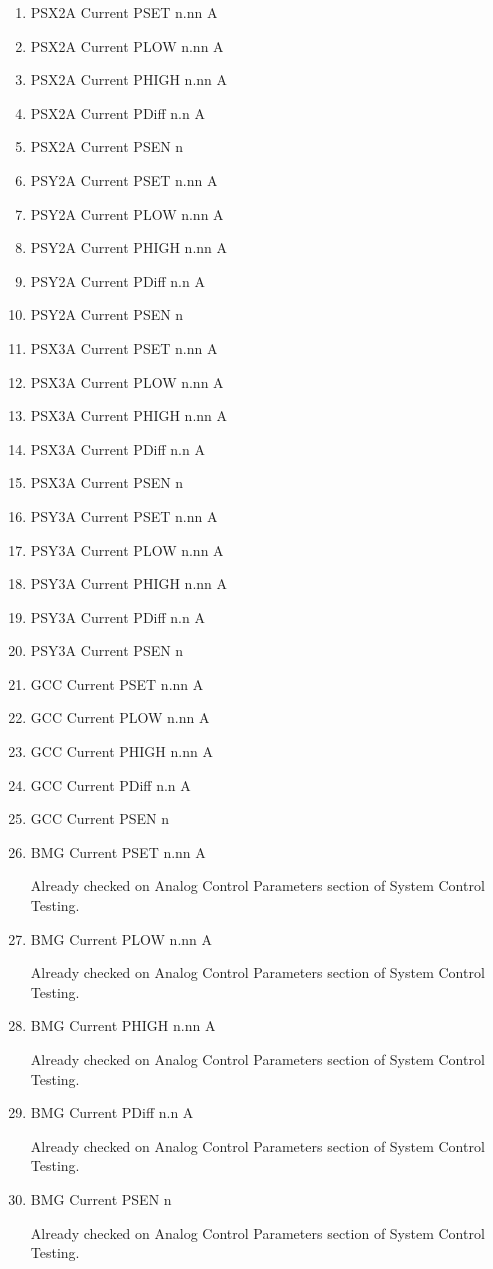 \documentclass[11pt]{book}		%
\begin{document}
\begin{enumerate}
 \item PSX2A Current PSET  n.nn A
 \item PSX2A Current PLOW  n.nn A
 \item PSX2A Current PHIGH n.nn A
 \item PSX2A Current PDiff n.n A
 \item PSX2A Current PSEN  n
 \item PSY2A Current PSET  n.nn A
 \item PSY2A Current PLOW  n.nn A
 \item PSY2A Current PHIGH n.nn A
 \item PSY2A Current PDiff n.n A
 \item PSY2A Current PSEN  n
 \item PSX3A Current PSET  n.nn A
 \item PSX3A Current PLOW  n.nn A
 \item PSX3A Current PHIGH n.nn A
 \item PSX3A Current PDiff n.n A
 \item PSX3A Current PSEN  n
 \item PSY3A Current PSET  n.nn A
 \item PSY3A Current PLOW  n.nn A
 \item PSY3A Current PHIGH n.nn A
 \item PSY3A Current PDiff n.n A
 \item PSY3A Current PSEN  n
 \item GCC Current PSET  n.nn A
 \item GCC Current PLOW  n.nn A
 \item GCC Current PHIGH n.nn A
 \item GCC Current PDiff n.n A
 \item GCC Current PSEN  n
 \item BMG Current PSET  n.nn A

\color{red}
Already checked on Analog Control Parameters section of System Control Testing.
\color{black}

 \item BMG Current PLOW  n.nn A

\color{red}
Already checked on Analog Control Parameters section of System Control Testing.
\color{black}

 \item BMG Current PHIGH n.nn A

\color{red}
Already checked on Analog Control Parameters section of System Control Testing.
\color{black}

 \item BMG Current PDiff n.n A

\color{red}
Already checked on Analog Control Parameters section of System Control Testing.
\color{black}

 \item BMG Current PSEN  n

\color{red}
Already checked on Analog Control Parameters section of System Control Testing.
\color{black}

\end{enumerate}
\end{document}
